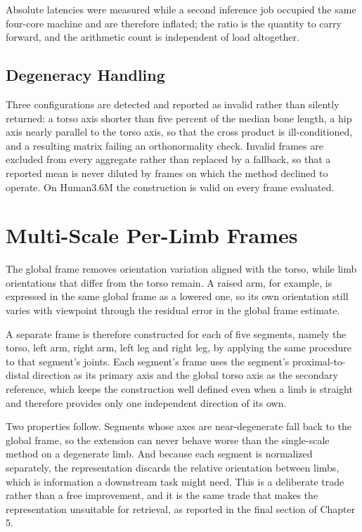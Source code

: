 \documentclass[12pt,a4paper]{report}
\begin{document}
Absolute latencies were measured while a second inference job occupied the same four-core machine and are therefore inflated; the ratio is the quantity to carry forward, and the arithmetic count is independent of load altogether.

\subsection{Degeneracy Handling}

Three configurations are detected and reported as invalid rather than silently returned: a torso axis shorter than five percent of the median bone length, a hip axis nearly parallel to the torso axis, so that the cross product is ill-conditioned, and a resulting matrix failing an orthonormality check. Invalid frames are excluded from every aggregate rather than replaced by a fallback, so that a reported mean is never diluted by frames on which the method declined to operate. On Human3.6M the construction is valid on every frame evaluated.

\section{Multi-Scale Per-Limb Frames}

The global frame removes orientation variation aligned with the torso, while limb orientations that differ from the torso remain. A raised arm, for example, is expressed in the same global frame as a lowered one, so its own orientation still varies with viewpoint through the residual error in the global frame estimate.

A separate frame is therefore constructed for each of five segments, namely the torso, left arm, right arm, left leg and right leg, by applying the same procedure to that segment's joints. Each segment's frame uses the segment's proximal-to-distal direction as its primary axis and the global torso axis as the secondary reference, which keeps the construction well defined even when a limb is straight and therefore provides only one independent direction of its own.

Two properties follow. Segments whose axes are near-degenerate fall back to the global frame, so the extension can never behave worse than the single-scale method on a degenerate limb. And because each segment is normalized separately, the representation discards the relative orientation between limbs, which is information a downstream task might need. This is a deliberate trade rather than a free improvement, and it is the same trade that makes the representation unsuitable for retrieval, as reported in the final section of Chapter 5.
\end{document}
